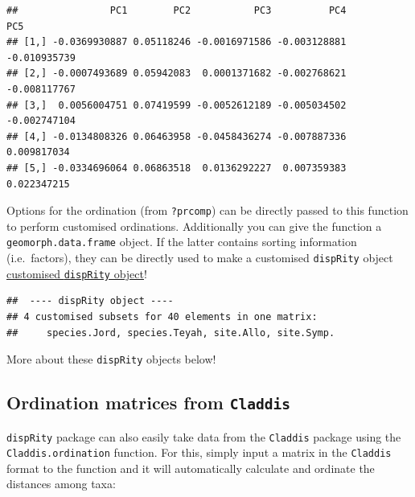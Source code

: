 \documentclass[
]{book}
\newenvironment{Shaded}{\begin{snugshade}}{\end{snugshade}}
\newcommand{\CommentTok}[1]{\textcolor[rgb]{0.56,0.35,0.01}{\textit{#1}}}
\newcommand{\DataTypeTok}[1]{\textcolor[rgb]{0.13,0.29,0.53}{#1}}
\newcommand{\KeywordTok}[1]{\textcolor[rgb]{0.13,0.29,0.53}{\textbf{#1}}}
\newcommand{\NormalTok}[1]{#1}
\newcommand{\OperatorTok}[1]{\textcolor[rgb]{0.81,0.36,0.00}{\textbf{#1}}}
\newcommand{\StringTok}[1]{\textcolor[rgb]{0.31,0.60,0.02}{#1}}
\begin{document}
\begin{verbatim}
##                PC1        PC2           PC3          PC4          PC5
## [1,] -0.0369930887 0.05118246 -0.0016971586 -0.003128881 -0.010935739
## [2,] -0.0007493689 0.05942083  0.0001371682 -0.002768621 -0.008117767
## [3,]  0.0056004751 0.07419599 -0.0052612189 -0.005034502 -0.002747104
## [4,] -0.0134808326 0.06463958 -0.0458436274 -0.007887336  0.009817034
## [5,] -0.0334696064 0.06863518  0.0136292227  0.007359383  0.022347215
\end{verbatim}

Options for the ordination (from \texttt{?prcomp}) can be directly passed to this function to perform customised ordinations.
Additionally you can give the function a \texttt{geomorph.data.frame} object.
If the latter contains sorting information (i.e.~factors), they can be directly used to make a customised \texttt{dispRity} object \protect\hyperlink{customised-subsets}{customised \texttt{dispRity} object}!

\begin{Shaded}
\end{Shaded}

\begin{verbatim}
##  ---- dispRity object ---- 
## 4 customised subsets for 40 elements in one matrix:
##     species.Jord, species.Teyah, site.Allo, site.Symp.
\end{verbatim}

More about these \texttt{dispRity} objects below!

\hypertarget{Claddis-ordination}{%
\subsection{\texorpdfstring{Ordination matrices from \texttt{Claddis}}{Ordination matrices from Claddis}}\label{Claddis-ordination}}

\texttt{dispRity} package can also easily take data from the \texttt{Claddis} package using the \texttt{Claddis.ordination} function.
For this, simply input a matrix in the \texttt{Claddis} format to the function and it will automatically calculate and ordinate the distances among taxa:
\end{document}

